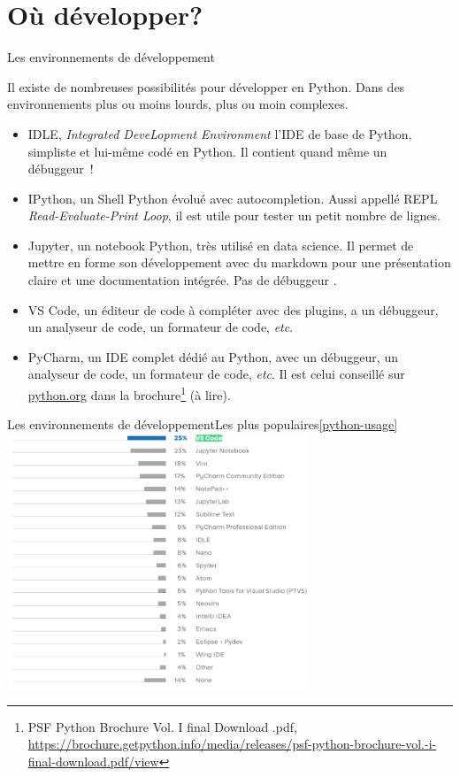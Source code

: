 \documentclass{beamer}
\begin{document}
    \section{Où développer?}\label{sec:where}


    \begin{frame}{Les environnements de développement}
        \begin{small}
            Il existe de nombreuses possibilités pour développer en Python.
            Dans des environnements plus ou moins lourds, plus ou moin complexes.
            \begin{itemize}
                \item IDLE, \textit{Integrated DeveLopment Environment} l'IDE de base de Python, simpliste et lui-même codé en Python.
                Il contient quand même un débuggeur~!
                \item IPython, un Shell Python évolué avec autocompletion.
                Aussi appellé REPL \textit{Read-Evaluate-Print Loop}, il est utile pour tester un petit nombre de lignes.
                \item Jupyter, un notebook Python, très utilisé en data science.
                Il permet de mettre en forme son développement avec du markdown pour une présentation claire et une documentation intégrée.
                Pas de débuggeur .
                \item VS Code, un éditeur de code à compléter avec des plugins, a un débuggeur, un analyseur de code, un formateur de code, \textit{etc}.
                \item PyCharm, un IDE complet dédié au Python, avec un débuggeur, un analyseur de code, un formateur de code, \textit{etc}.
                Il est celui conseillé sur \url{python.org} dans la brochure\footnote{PSF Python Brochure Vol. I final Download .pdf, \url{https://brochure.getpython.info/media/releases/psf-python-brochure-vol.-i-final-download.pdf/view}} (à lire).
            \end{itemize}
        \end{small}
    \end{frame}

    \begin{frame}{Les environnements de développement}{Les plus populaires\cref{python-usage}}
        \centering
        \includegraphics[width=9cm]{image/survey-ides}
    \end{frame}
\end{document}
